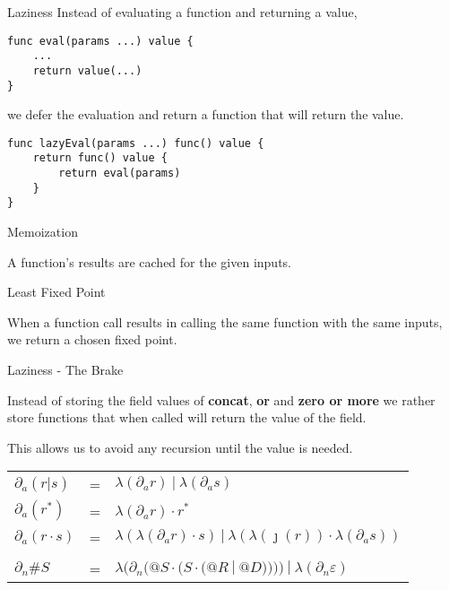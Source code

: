 \documentclass[10pt]{beamer}
\begin{document}
\begin{frame}[fragile]{Laziness}
Instead of evaluating a function and returning a value, 
\begin{verbatim}
func eval(params ...) value {
    ...
    return value(...)
}
\end{verbatim}
we defer the evaluation and return a function that will return the value.
\begin{verbatim}
func lazyEval(params ...) func() value {
    return func() value {
        return eval(params)
    }
}
\end{verbatim}
\end{frame}

\begin{frame}{Memoization}
\begin{center}
A function's results are cached for the given inputs.
\end{center}
\end{frame}

\begin{frame}[fragile]{Least Fixed Point}
\begin{center}
When a function call results in calling the same function with the same inputs, we return a chosen fixed point.
\end{center}
\end{frame}

\begin{frame}{Laziness - The Brake}


Instead of storing the field values of \textbf{concat}, \textbf{or} and \textbf{zero or more} we rather store functions that when called will return the value of the field.

This allows us to avoid any recursion until the value is needed.

\begin{center}
\begin{tabular}{l c l}
$\partial_a (r | s) $ & = & $\lambda(\partial_a r)\ |\  \lambda(\partial_a s) $ \\
$\partial_a (r^{*}) $ & = & $\lambda(\partial_a r) \cdot r^{*} $ \\
$\partial_a (r \cdot s) $ & = & $\lambda(\lambda(\partial_a r) \cdot s)\ |\  \lambda(\lambda(\jmath(r)) \cdot \lambda(\partial_a s)) $ \\
\\
$\partial_n \#S$ &=& $\lambda(\partial_n(@S \cdot (S \cdot ( @R\ |\ @D ))))\ |\ \lambda(\partial_n \varepsilon)$ \\
\end{tabular}
\end{center}
\end{frame}
\end{document}
